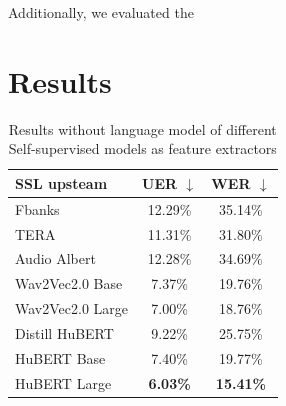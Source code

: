 Additionally, we evaluated the  

\section{Results}

\begin{table}[ht]
\centering
\begin{tabular}{lcc} 
\hline
SSL upsteam & UER $\downarrow$ & WER $\downarrow$ \\ 
\hline
Fbanks & 12.29\% & 35.14\% \\ 
\hline
TERA \cite{tera} & 11.31\% & 31.80\% \\
Audio Albert \cite{chi2021audio} & 12.28\% & 34.69\% \\
Wav2Vec2.0 Base & 7.37\% & 19.76\% \\
Wav2Vec2.0 Large & 7.00\% & 18.76\% \\
Distill HuBERT \cite{chang2022distilhubert} & 9.22\% & 25.75\% \\
HuBERT Base & 7.40\% & 19.77\% \\
HuBERT Large & \textbf{6.03\%} & \textbf{15.41\%} \\
\hline
\end{tabular}
\caption{Results without language model of different Self-supervised models as feature extractors}
\label{tab:ssl}
\end{table}
